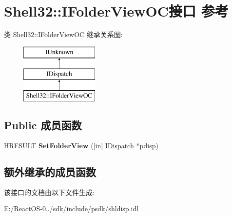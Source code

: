\hypertarget{interface_shell32_1_1_i_folder_view_o_c}{}\section{Shell32\+:\+:I\+Folder\+View\+O\+C接口 参考}
\label{interface_shell32_1_1_i_folder_view_o_c}
类 Shell32\+:\+:I\+Folder\+View\+OC 继承关系图\+:\begin{figure}[H]
\begin{center}
\leavevmode
\includegraphics[height=3.000000cm]{interface_shell32_1_1_i_folder_view_o_c}
\end{center}
\end{figure}
\subsection*{Public 成员函数}
\begin{DoxyCompactItemize}
\item 
\mbox{\label{interface_shell32_1_1_i_folder_view_o_c_ab5e0e5a675f65e63ec94c15d71754ad9}} 
H\+R\+E\+S\+U\+LT {\bfseries Set\+Folder\+View} (\mbox{[}in\mbox{]} \hyperlink{interface_i_dispatch}{I\+Dispatch} $\ast$pdisp)
\end{DoxyCompactItemize}
\subsection*{额外继承的成员函数}


该接口的文档由以下文件生成\+:\begin{DoxyCompactItemize}
\item 
E\+:/\+React\+O\+S-\/0../sdk/include/psdk/shldisp.\+idl\end{DoxyCompactItemize}
